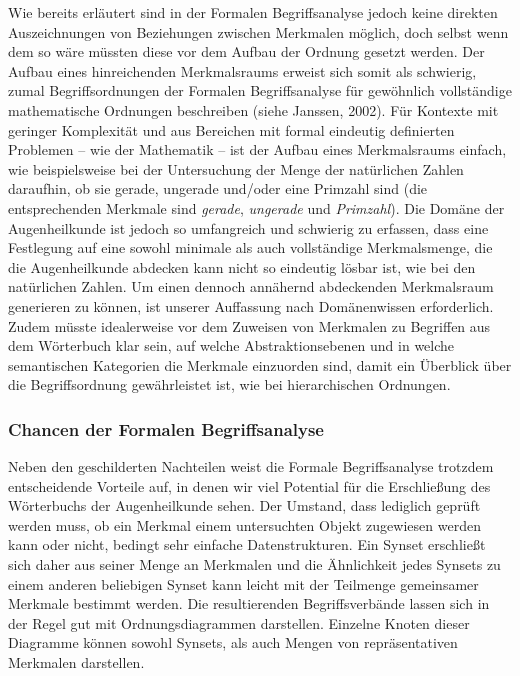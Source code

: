 \documentclass[pagesize,paper=A4,DIV=calc,fontsize=12pt,draft=false]{scrreprt}
\begin{document}
Wie bereits erläutert sind in der Formalen Begriffsanalyse jedoch keine direkten Auszeichnungen von Beziehungen zwischen Merkmalen möglich, doch selbst wenn dem so wäre müssten diese vor dem Aufbau der Ordnung gesetzt werden. 
Der Aufbau eines hinreichenden Merkmalsraums erweist sich somit als schwierig, zumal Begriffsordnungen der Formalen Begriffsanalyse für gewöhnlich vollständige mathematische Ordnungen beschreiben (siehe Janssen, 2002). 
Für Kontexte mit geringer Komplexität und aus Bereichen mit formal eindeutig definierten Problemen -- wie der Mathematik -- ist der Aufbau eines Merkmalsraums einfach, wie beispielsweise bei der Untersuchung der Menge der natürlichen Zahlen daraufhin, ob sie gerade, ungerade und/oder eine Primzahl sind (die entsprechenden Merkmale sind \emph{gerade}, \emph{ungerade} und \emph{Primzahl}). 
Die Domäne der Augenheilkunde ist jedoch so umfangreich und schwierig zu erfassen, dass eine Festlegung auf eine sowohl minimale als auch vollständige Merkmalsmenge, die die Augenheilkunde abdecken kann nicht so eindeutig lösbar ist, wie bei den natürlichen Zahlen. 
Um einen dennoch annähernd abdeckenden Merkmalsraum generieren zu können, ist unserer Auffassung nach Domänenwissen erforderlich. 
Zudem müsste idealerweise vor dem Zuweisen von Merkmalen zu Begriffen aus dem Wörterbuch klar sein, auf welche Abstraktionsebenen und in welche semantischen Kategorien die Merkmale einzuorden sind, damit ein Überblick über die Begriffsordnung gewährleistet ist, wie bei hierarchischen Ordnungen. 

\subsubsection{Chancen der Formalen Begriffsanalyse}

Neben den geschilderten Nachteilen weist die Formale Begriffsanalyse trotzdem entscheidende Vorteile auf, in denen wir viel Potential für die Erschließung des Wörterbuchs der Augenheilkunde sehen. 
Der Umstand, dass lediglich geprüft werden muss, ob ein Merkmal einem untersuchten Objekt zugewiesen werden kann oder nicht, bedingt sehr einfache Datenstrukturen.
Ein Synset erschließt sich daher aus seiner Menge an Merkmalen und die Ähnlichkeit jedes Synsets zu einem anderen beliebigen Synset kann leicht mit der Teilmenge gemeinsamer Merkmale bestimmt werden.
Die resultierenden Begriffsverbände lassen sich in der Regel gut mit Ordnungsdiagrammen darstellen.
Einzelne Knoten dieser Diagramme können sowohl Synsets, als auch Mengen von repräsentativen Merkmalen darstellen. 
\end{document}
